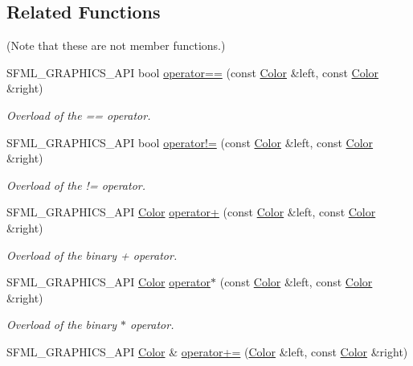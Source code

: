 \subsection*{Related Functions}
(Note that these are not member functions.) \begin{DoxyCompactItemize}
\item 
S\+F\+M\+L\+\_\+\+G\+R\+A\+P\+H\+I\+C\+S\+\_\+\+A\+P\+I bool \hyperlink{classsf_1_1_color_a7498d4670c7655e8d4d91ef49cc6064e}{operator==} (const \hyperlink{classsf_1_1_color}{Color} \&left, const \hyperlink{classsf_1_1_color}{Color} \&right)
\begin{DoxyCompactList}\small\item\em Overload of the == operator. \end{DoxyCompactList}\item 
S\+F\+M\+L\+\_\+\+G\+R\+A\+P\+H\+I\+C\+S\+\_\+\+A\+P\+I bool \hyperlink{classsf_1_1_color_a5d6501b7dd05f481b79f7163899f1d92}{operator!=} (const \hyperlink{classsf_1_1_color}{Color} \&left, const \hyperlink{classsf_1_1_color}{Color} \&right)
\begin{DoxyCompactList}\small\item\em Overload of the != operator. \end{DoxyCompactList}\item 
S\+F\+M\+L\+\_\+\+G\+R\+A\+P\+H\+I\+C\+S\+\_\+\+A\+P\+I \hyperlink{classsf_1_1_color}{Color} \hyperlink{classsf_1_1_color_a90e79ecc276114cda519a88119ac645b}{operator+} (const \hyperlink{classsf_1_1_color}{Color} \&left, const \hyperlink{classsf_1_1_color}{Color} \&right)
\begin{DoxyCompactList}\small\item\em Overload of the binary + operator. \end{DoxyCompactList}\item 
S\+F\+M\+L\+\_\+\+G\+R\+A\+P\+H\+I\+C\+S\+\_\+\+A\+P\+I \hyperlink{classsf_1_1_color}{Color} \hyperlink{classsf_1_1_color_aa9de267d831b4ec8ba65b627e51d50c3}{operator$\ast$} (const \hyperlink{classsf_1_1_color}{Color} \&left, const \hyperlink{classsf_1_1_color}{Color} \&right)
\begin{DoxyCompactList}\small\item\em Overload of the binary $\ast$ operator. \end{DoxyCompactList}\item 
S\+F\+M\+L\+\_\+\+G\+R\+A\+P\+H\+I\+C\+S\+\_\+\+A\+P\+I \hyperlink{classsf_1_1_color}{Color} \& \hyperlink{classsf_1_1_color_a19917f2453a4acfd69de2539bfab8031}{operator+=} (\hyperlink{classsf_1_1_color}{Color} \&left, const \hyperlink{classsf_1_1_color}{Color} \&right)

\end{DoxyCompactItemize}
